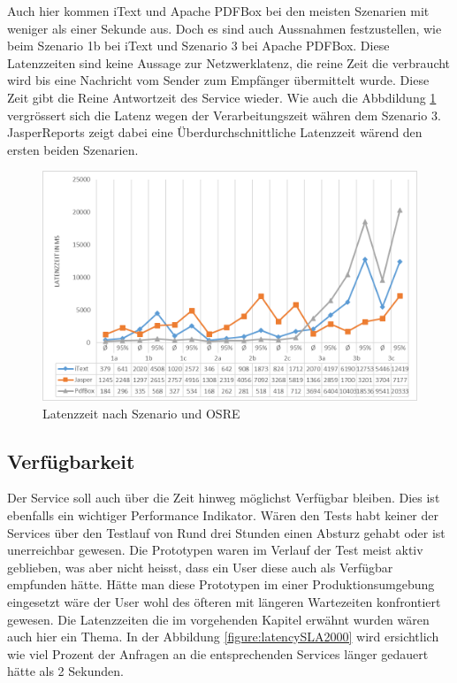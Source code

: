 \documentclass[main.tex]{subfiles}
\begin{document}
Auch hier kommen iText und Apache PDFBox bei den meisten Szenarien mit weniger als einer Sekunde aus. Doch es sind auch Aussnahmen festzustellen, wie beim Szenario 1b bei iText und Szenario 3 bei Apache PDFBox. 
Diese Latenzzeiten sind keine Aussage zur Netzwerklatenz, die reine Zeit die verbraucht wird bis eine Nachricht vom Sender zum Empfänger übermittelt wurde. Diese Zeit gibt die Reine Antwortzeit des Service wieder. Wie auch die Abbdildung  \ref{figure:latencySzenario} vergrössert sich die Latenz wegen der Verarbeitungszeit währen dem Szenario 3. JasperReports zeigt dabei eine Überdurchschnittliche Latenzzeit wärend den ersten beiden Szenarien. 

\begin{figure}[!ht]
\includegraphics[width=\textwidth]{mainpart/4_analyse_img/LatenzzeitSzen.png}
 \caption{Latenzzeit nach Szenario und OSRE}
 \label{figure:latencySzenario}
\end{figure}

\subsection{Verfügbarkeit}

Der Service soll auch über die Zeit hinweg möglichst Verfügbar bleiben. Dies ist ebenfalls ein wichtiger Performance Indikator. Wären den Tests habt keiner der Services über den Testlauf von Rund drei Stunden einen Absturz gehabt oder ist unerreichbar gewesen. Die Prototypen waren im Verlauf der Test meist aktiv geblieben, was aber nicht heisst, dass ein User diese auch als Verfügbar empfunden hätte. Hätte man diese Prototypen im einer Produktionsumgebung eingesetzt wäre der User wohl des öfteren mit längeren Wartezeiten konfrontiert gewesen. Die Latenzzeiten die im vorgehenden  Kapitel erwähnt wurden wären auch hier ein Thema. In der Abbildung \ref{figure:latencySLA2000} wird ersichtlich wie viel Prozent der Anfragen an die entsprechenden Services länger gedauert hätte als 2 Sekunden. 
\end{document}
